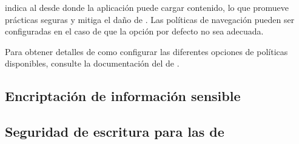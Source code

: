 


\httpHeaderCSPINT  indica al \browserINT desde donde la aplicación puede cargar contenido, lo que promueve prácticas seguras y mitiga el daño de \crossSiteScriptingINT \cite{online_html5rocks_CSP_introduction}. Las políticas de navegación pueden ser configuradas en el caso de que la opción por defecto no sea adecuada.

Para obtener detalles de como configurar las diferentes opciones de políticas disponibles, consulte la documentación del \packageAS  de \meteorNAME \browserPolicyPackage.



\subsection{Encriptación de información sensible}




\subsection{Seguridad de escritura para las \collectionsname de \mongodbNAME}







